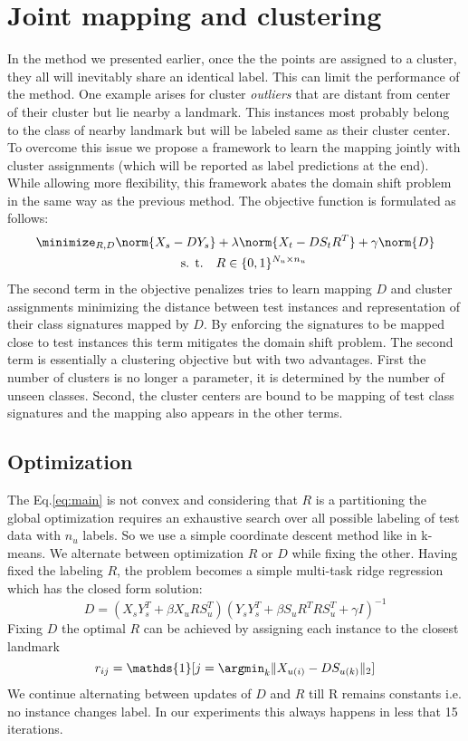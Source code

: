 \section{Joint mapping and clustering}
\label{joint}
In the method we presented earlier, once the the points are assigned to a cluster,
they all will inevitably share an identical label. This can limit the performance of the method. One
example arises for cluster \textit{outliers} that are distant from center of their cluster but lie
nearby a landmark. This instances most probably belong to the class of nearby landmark but will be labeled same
as their cluster center. To overcome this issue we propose a framework to learn the mapping jointly with cluster assignments
 (which will be reported as label predictions at the end).
 While allowing more flexibility, this framework abates the domain shift problem in the same way as the previous method.
 The objective function is formulated as follows:
 \begin{align} \label{eq:main}
   \minimize_{R,D} \norm{X_s - D Y_s}  &+ \lambda \norm{X_t - D S_t R^T } + \gamma \norm{D} \\
   \text{s. t.} \quad & R \in \{0,1\}^{N_u \times n_u}
 \end{align}
 The second term in the objective penalizes tries to learn mapping $D$ and cluster assignments minimizing the
 distance between test instances and representation of their class signatures mapped by $D$. By enforcing
 the signatures to be mapped close to test instances this term mitigates the domain shift problem.
 The second term is essentially a clustering objective but with two advantages. First the number of clusters is no longer a
 parameter, it is determined by the number of unseen classes. Second, the cluster centers are bound to be
 mapping of test class signatures and the mapping also appears in the other terms.

\subsection{Optimization}
The Eq.\eqref{eq:main} is not convex and considering that $R$ is a partitioning the global optimization requires an
exhaustive search over all possible labeling of test data with $n_u$ labels. So we use a simple coordinate descent
method like in k-means. We alternate between optimization $R$ or $D$ while fixing the other.
Having fixed the labeling $R$, the problem becomes a simple multi-task ridge regression which has the closed form solution:
\begin{equation} \label{eq:d_update}
  D = (X_s Y_s^T + \beta X_u R S_u^T) (Y_s Y_s^T + \beta S_u R^T R S_u^T  + \gamma I)^{-1}
\end{equation}
Fixing $D$ the optimal $R$ can be achieved by assigning each instance to the closest landmark
\begin{equation} \label{eq:r_update}
  r_{ij} = \mathds{1}[j = \argmin_{k} \lVert X_{u(i)} - D S_{u(k)} \rVert_2 ]
\end{equation}
We continue alternating between updates of $D$ and $R$ till R remains constants i.e. no instance changes label. In our experiments this always happens
in less that 15 iterations.

